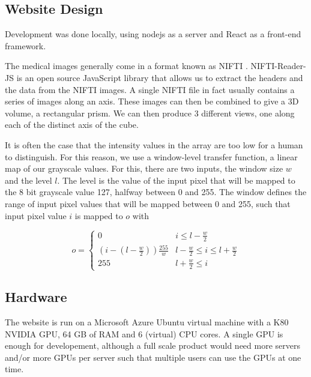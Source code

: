 \subsection{Website Design}
Development was done locally, using nodejs as a server and React as a front-end framework. 

The medical images generally come in a format known as NIFTI \cite{NIFTI}. NIFTI-Reader-JS \cite{NIFTI-Reader} is an open source JavaScript library that allows us to extract the headers and the data from the NIFTI images. A single NIFTI file in fact usually contains a series of images along an axis. These images can then be combined to give a 3D volume, a rectangular prism. We can then produce 3 different views, one along each of the distinct axis of the cube. 

It is often the case that the intensity values in the array are too low for a human to distinguish. For this reason, we use a window-level transfer function, a linear map of our grayscale values. For this, there are two inputs, the window size $w$ and the level $l$. The level is the value of the input pixel that will be mapped to the 8 bit grayscale value 127, halfway between 0 and 255. The window defines the range of input pixel values that will be mapped between 0 and 255, such that input pixel value $i$ is mapped to $o$ with


\begin{equation} o = \begin{cases} 
      0 & i\leq l - \frac{w}{2} \\
      (i - (l - \frac{w}{2}))\frac{255}{w} & l - \frac{w}{2} \leq i\leq l + \frac{w}{2} \\
      255 & l+\frac{w}{2}\leq i 
   \end{cases}
\end{equation}



\subsection{Hardware}
The website is run on a Microsoft Azure Ubuntu virtual machine with a K80 NVIDIA GPU, 64 GB of RAM and 6 (virtual) CPU cores. A single GPU is enough for developement, although a full scale product would need more servers and/or more GPUs per server such that multiple users can use the GPUs at one time.